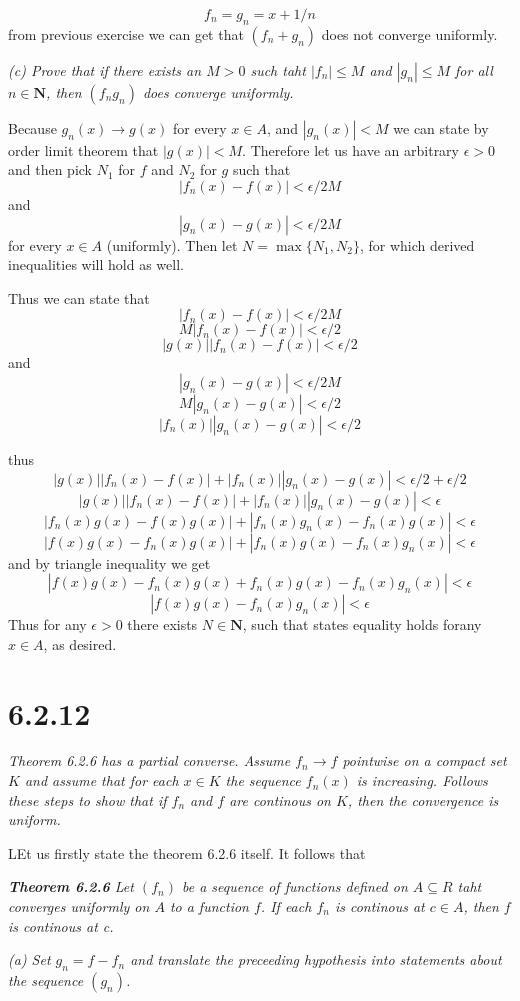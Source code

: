 \documentclass[11pt,oneside,titlepage]{book}
\begin{document}
$$f_n = g_n = x + 1/n$$
from previous exercise we can get that $(f_n + g_n)$ does not converge
uniformly.

\textit{(c) Prove that if there exists an $M > 0$ such taht $|f_n| \leq M$
  and $|g_n| \leq M$ for all $n \in \textbf{N}$, then $(f_n g_n)$
  does converge uniformly.}

Because $g_n(x) \to g(x)$ for every $x \in A$, and
$|g_n(x)| < M $ we can state by order limit theorem that $|g(x)| < M$.
Therefore let us have an arbitrary $\epsilon > 0$ and then pick
$N_1$ for $f$ and $N_2$ for $g$ such that
$$|f_n(x) - f(x)| < \epsilon/2M$$
and
$$|g_n(x) - g(x)| < \epsilon/2M$$
for every $x \in A$ (uniformly). Then let $N = \max\{N_1, N_2\}$, for
which derived inequalities will hold as well.

Thus we can state that
$$|f_n(x) - f(x)| < \epsilon/2M$$
$$M|f_n(x) - f(x)| < \epsilon/2$$
$$|g(x)||f_n(x) - f(x)| < \epsilon/2$$
and
$$|g_n(x) - g(x)| < \epsilon/2M$$
$$M|g_n(x) - g(x)| < \epsilon/2$$
$$|f_n(x)||g_n(x) - g(x)| < \epsilon/2$$

thus
$$|g(x)||f_n(x) - f(x)| + |f_n(x)||g_n(x) - g(x)| < \epsilon/2 + \epsilon/2$$
$$|g(x)||f_n(x) - f(x)| + |f_n(x)||g_n(x) - g(x)| < \epsilon$$
$$|f_n(x)g(x) - f(x)g(x)| + |f_n(x)g_n(x) - f_n(x)g(x)| < \epsilon$$
$$|f(x)g(x) - f_n(x)g(x)| + | f_n(x)g(x) - f_n(x)g_n(x)| < \epsilon$$
and by triangle inequality we get
$$|f(x)g(x) - f_n(x)g(x) + f_n(x)g(x) - f_n(x)g_n(x)| < \epsilon$$
$$|f(x)g(x)  - f_n(x)g_n(x)| < \epsilon$$
Thus for any $\epsilon > 0$ there exists $N \in \textbf{N}$, such that
states equality holds forany $x \in A$, as desired.

\section*{6.2.12}
\textit{Theorem 6.2.6 has a partial converse. Assume $f_n \to f$ pointwise on
  a compact set $K$ and assume that for each $x \in K$ the sequence $f_n(x)$
  is increasing. Follows these steps to show that if $f_n$ and $f$ are
  continous on $K$, then the convergence is uniform.}

LEt us firstly state the theorem 6.2.6 itself. It follows that

\textit{\textbf{Theorem 6.2.6} Let $(f_n)$ be a sequence of functions defined
  on $A \subseteq R$ taht converges uniformly on $A$ to a function $f$. If
  each $f_n$ is continous at $c \in A$, then $f$ is continous at c.}


\textit{(a) Set $g_n = f - f_n$ and translate the preceeding hypothesis
  into statements about the sequence $(g_n)$.}
\end{document}
